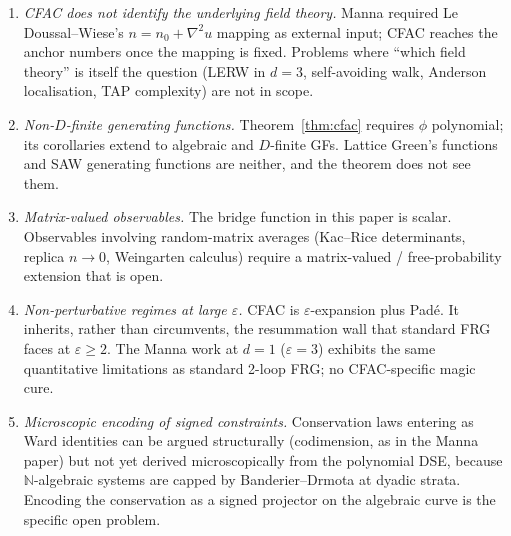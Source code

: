\documentclass[11pt,a4paper]{article}
\theoremstyle{plain}
\theoremstyle{definition}
\begin{document}
\begin{enumerate}[label=(\alph*),leftmargin=1.4em,itemsep=1pt]
  \item \emph{CFAC does not identify the underlying field
    theory.}  Manna required Le Doussal--Wiese's
    $n = n_0 + \nabla^2 u$ mapping as external input; CFAC
    reaches the anchor numbers once the mapping is fixed.
    Problems where ``which field theory'' is itself the question
    (LERW in $d=3$, self-avoiding walk, Anderson localisation,
    TAP complexity) are not in scope.
  \item \emph{Non-$D$-finite generating functions.}
    Theorem~\ref{thm:cfac} requires $\phi$ polynomial; its
    corollaries extend to algebraic and $D$-finite GFs.  Lattice
    Green's functions and SAW generating functions are neither,
    and the theorem does not see them.
  \item \emph{Matrix-valued observables.}  The bridge function in
    this paper is scalar.  Observables involving random-matrix
    averages (Kac--Rice determinants, replica $n\to 0$,
    Weingarten calculus) require a matrix-valued / free-probability
    extension that is open.
  \item \emph{Non-perturbative regimes at large $\varepsilon$.}
    CFAC is $\varepsilon$-expansion plus Pad\'e.  It inherits, rather
    than circumvents, the resummation wall that standard FRG
    faces at $\varepsilon \geq 2$.  The Manna work at $d=1$
    ($\varepsilon = 3$) exhibits the same quantitative limitations as
    standard 2-loop FRG; no CFAC-specific magic cure.
  \item \emph{Microscopic encoding of signed constraints.}
    Conservation laws entering as Ward identities can be
    argued structurally (codimension, as in the Manna paper) but
    not yet derived microscopically from the polynomial DSE,
    because $\mathbb{N}$-algebraic systems are capped by
    Banderier--Drmota at dyadic strata.  Encoding the
    conservation as a signed projector on the algebraic curve
    is the specific open problem.
\end{enumerate}
\end{document}
